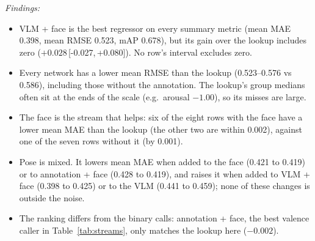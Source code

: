 \documentclass[11pt]{article}
\newcommand{\ci}[2]{\,[#1,\,#2]}
\begin{document}
\begin{table}[!htbp]
{\emph{Findings:}
\begin{itemize}
  \item VLM + face is the best regressor on every summary metric (mean MAE 0.398, mean RMSE 0.523, mAP 0.678), but its gain over the lookup includes zero ($+0.028$\ci{-0.027}{+0.080}). No row's interval excludes zero.
  \item Every network has a lower mean RMSE than the lookup (0.523--0.576 vs 0.586), including those without the annotation. The lookup's group medians often sit at the ends of the scale (e.g.\ arousal $-1.00$), so its misses are large.
  \item The face is the stream that helps: six of the eight rows with the face have a lower mean MAE than the lookup (the other two are within 0.002), against one of the seven rows without it (by 0.001).
  \item Pose is mixed. It lowers mean MAE when added to the face (0.421 to 0.419) or to annotation + face (0.428 to 0.419), and raises it when added to VLM + face (0.398 to 0.425) or to the VLM (0.441 to 0.459); none of these changes is outside the noise.
  \item The ranking differs from the binary calls: annotation + face, the best valence caller in Table~\ref{tab:streams}, only matches the lookup here ($-0.002$).
\end{itemize}}
\end{table}
\end{document}
